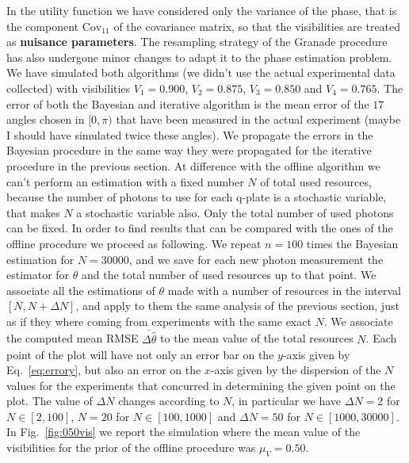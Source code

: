 \documentclass[aps, pra, 10pt, twocolumn, superscriptaddress,floatfix]{revtex4-1}
\begin{document}
In the utility function we have considered only the variance of the phase, that is the component $\text{Cov}_{11}$ of the covariance matrix, so that the visibilities are treated as \textbf{nuisance parameters}. The resampling strategy of the Granade procedure has also undergone minor changes to adapt it to the phase estimation problem. We have simulated both algorithms (we didn't use the actual experimental data collected) with visibilities $V_1 = 0.900$, $V_2 = 0.875$, $V_3 = 0.850$ and $V_4 = 0.765$. The error of both the Bayesian and iterative algorithm is the mean error of the $17$ angles chosen in $[0, \pi)$ that have been measured in the actual experiment (maybe I should have simulated twice these angles). We propagate the errors in the Bayesian procedure in the same way they were propagated for the iterative procedure in the previous section. At difference with the offline algorithm we can't perform an estimation with a fixed number $N$ of total used resources, because the number of photons to use for each q-plate is a stochastic variable, that makes $N$ a stochastic variable also. Only the total number of used photons can be fixed. In order to find results that can be compared with the ones of the offline procedure we proceed as following. We repeat $n = 100$ times the Bayesian estimation for $N=30000$, and we save for each new photon measurement the estimator for $\theta$ and the total number of used resources up to that point. We associate all the estimations of $\theta$ made with a number of resources in the interval $[N, N + \Delta N]$, and apply to them the same analysis of the previous section, just as if they where coming from experiments with the same exact $N$. We associate the computed mean RMSE $\overline{\Delta \hat{\theta}}$ to the mean value of the total resources $N$. Each point of the plot will have not only an error bar on the $y$-axis given by Eq.~\eqref{eq:errory}, but also an error on the $x$-axis given by the dispersion of the $N$ values for the experiments that concurred in determining the given point on the plot. The value of $\Delta N$ changes according to $N$, in particular we have $\Delta N = 2$ for $N \in \left[2, 100 \right]$, $N = 20$ for $N \in \left[100, 1000 \right]$ and $\Delta N = 50$ for $N \in \left[1000, 30000 \right]$. In Fig.~\ref{fig:050vis} we report the simulation where the mean value of the visibilities for the prior of the offline procedure was $\mu_V = 0.50$.
%
\end{document}
